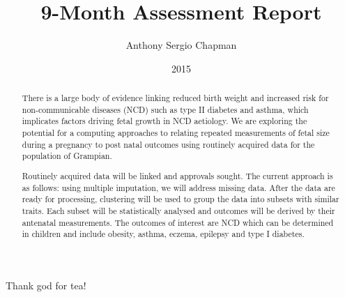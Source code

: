 \documentclass[bsc]{abdnthesis}
\author{Anthony Sergio Chapman}
\title{9-Month Assessment Report}
\date{2015}
\begin{document}
\maketitle
\makedeclaration


\begin{abstract}
There is a large body of evidence linking reduced birth weight and increased risk for non-communicable diseases (NCD) such as type II diabetes and asthma, which implicates factors driving fetal growth in NCD aetiology. We are exploring the potential for a computing approaches to relating repeated measurements of fetal size during a pregnancy to post natal outcomes using routinely acquired data for the population of Grampian.

Routinely acquired data will be linked and approvals sought.  The current approach is as follows: using multiple imputation, we will address missing data. After the data are ready for processing, clustering will be used to group the data into subsets with similar traits. Each subset will be statistically analysed and outcomes will be derived by their antenatal measurements. The outcomes of interest are NCD which can be determined in children and include obesity, asthma, eczema, epilepsy and type I diabetes.
\end{abstract}

\begin{acknowledgements}
  Thank god for tea!
\end{acknowledgements}

\tableofcontents

\end{document}
